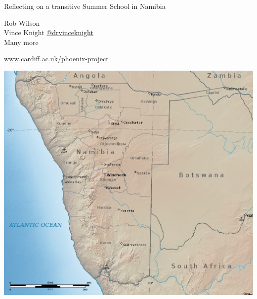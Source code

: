 \documentclass{beamer}
\begin{document}
    \begin{frame}
        \begin{center}
            \Huge
                Reflecting on a transitive Summer School in Namibia

               \vfill

            \Large
               Rob Wilson\\
               Vince Knight \href{https://twitter.com/drvinceknight}{@drvinceknight}\\
               Many more
        \end{center}

    \end{frame}

    \begin{frame}
        \begin{center}
            \Large
            \url{www.cardiff.ac.uk/phoenix-project}
        \end{center}
    \end{frame}

    \begin{frame}
        \begin{center}
            \includegraphics[width=.8\textwidth]{./assets/map_of_namibia.jpg}
        \end{center}
    \end{frame}
\end{document}
